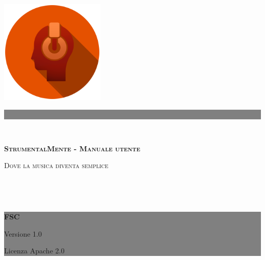 \begin{titlingpage}
	\noindent\begin{minipage}{0.6\textwidth}
	\hspace*{3.5cm}\includegraphics[width=5cm]{../include/LogoStrumentalMente.png}
	\end{minipage}\begin{minipage}{0.4\textwidth}
	\colorbox{gray}{\parbox{\textwidth}{~\vspace*{7cm}}}
	\end{minipage}\\
	\colorbox{mainColor}{\parbox[c][3.7cm][c]{\textwidth}{\color{white}\Huge\flushright \textsc{\bf StrumentalMente - Manuale utente}\hspace*{2.5cm}\par \Large \textsc{Dove la musica diventa semplice}\hspace*{2.5cm}}}\\
	\begin{minipage}{0.6\textwidth}
	~
	\end{minipage}\begin{minipage}{0.4\textwidth}
	\colorbox{gray}{\parbox[c][18.3cm]{\textwidth}{\color{white}\centering\vfill \textbf{FSC}\par Versione 1.0\par Licenza Apache 2.0\vspace*{2.5cm}}}
	\end{minipage}
	\restoregeometry
\end{titlingpage}